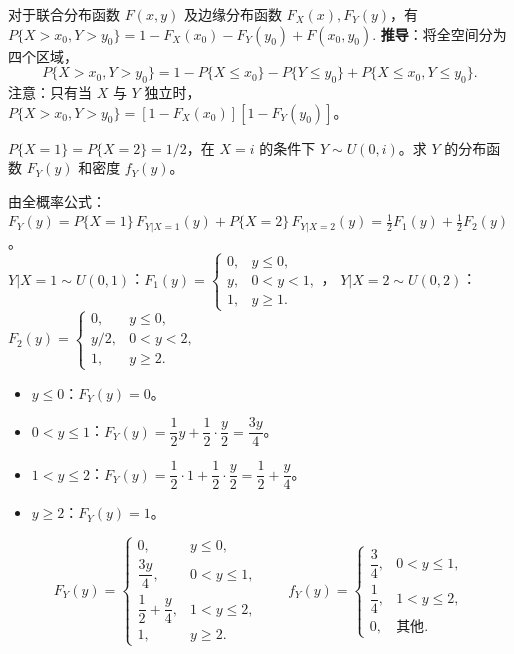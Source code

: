 \documentclass[lang=cn,11pt]{elegantbook}
\begin{document}
\begin{property}[区域概率公式]\label{prop:region-prob}
对于联合分布函数 $F(x,y)$ 及边缘分布函数 $F_X(x), F_Y(y)$，有
\(
P\{X > x_0, Y > y_0\} = 1 - F_X(x_0) - F_Y(y_0) + F(x_0, y_0).
\)
\textbf{推导}：将全空间分为四个区域，
\[
P\{X > x_0, Y > y_0\} = 1 - P\{X \leqslant x_0\} - P\{Y \leqslant y_0\} + P\{X \leqslant x_0, Y \leqslant y_0\}.
\]
注意：只有当 $X$ 与 $Y$ 独立时，$P\{X > x_0, Y > y_0\} = [1-F_X(x_0)][1-F_Y(y_0)]$。
\end{property}

\begin{exercise}[混合条件分布求 $F_Y$] \label{exer:3-c17}
$P\{X=1\} = P\{X=2\} = 1/2$，在 $X=i$ 的条件下 $Y \sim U(0,i)$。求 $Y$ 的分布函数 $F_Y(y)$ 和密度 $f_Y(y)$。
\end{exercise}
\begin{solution}
由全概率公式：$F_Y(y) = P\{X=1\}\,F_{Y|X=1}(y) + P\{X=2\}\,F_{Y|X=2}(y) = \frac{1}{2}F_1(y) + \frac{1}{2}F_2(y)$。\\
$Y|X=1 \sim U(0,1)$：$F_1(y) = \begin{cases} 0, & y \leqslant 0, \\ y, & 0 < y < 1, \\ 1, & y \geqslant 1. \end{cases}$，
$Y|X=2 \sim U(0,2)$：$F_2(y) = \begin{cases} 0, & y \leqslant 0, \\ y/2, & 0 < y < 2, \\ 1, & y \geqslant 2. \end{cases}$
\begin{itemize}
    \item $y \leqslant 0$：$F_Y(y) = 0$。
    \item $0 < y \leqslant 1$：$F_Y(y) = \dfrac{1}{2}y + \dfrac{1}{2}\cdot\dfrac{y}{2} = \dfrac{3y}{4}$。
    \item $1 < y \leqslant 2$：$F_Y(y) = \dfrac{1}{2}\cdot 1 + \dfrac{1}{2}\cdot\dfrac{y}{2} = \dfrac{1}{2} + \dfrac{y}{4}$。
    \item $y \geqslant 2$：$F_Y(y) = 1$。
\end{itemize}
\[
F_Y(y) = \begin{cases} 0, & y \leqslant 0, \\ \dfrac{3y}{4}, & 0 < y \leqslant 1, \\ \dfrac{1}{2} + \dfrac{y}{4}, & 1 < y \leqslant 2, \\ 1, & y \geqslant 2. \end{cases}
\qquad
f_Y(y) = \begin{cases} \dfrac{3}{4}, & 0 < y \leqslant 1, \\ \dfrac{1}{4}, & 1 < y \leqslant 2, \\ 0, & \text{其他}. \end{cases}
\]
\end{solution}
\end{document}
